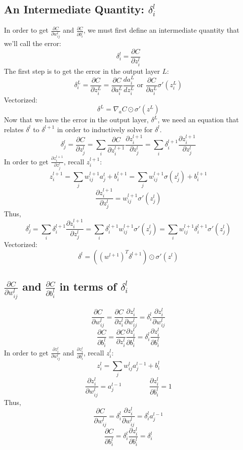\documentclass[11pt]{article}
\begin{document}
\subsection{An Intermediate Quantity: $\delta_i^l$}
In order to get $\frac{\partial C}{\partial w_{ij}^l}$ and $\frac{\partial C}{\partial b_i^l}$, we must first define an intermediate quantity that we'll call the error:
\[\delta_i^l = \frac{\partial C}{\partial z_i^l}\]
The first step is to get the error in the output layer $L$:
\[\delta_i^L = \frac{\partial C}{\partial z_i^L} = \frac{\partial C}{\partial a_i^L} \frac{d a_i^L}{d z_i^L} \text{ or } \frac{\partial C}{\partial a_i^L} \sigma'(z_i^L)\]
Vectorized:
\[\delta^L = \nabla_a C \odot \sigma'(z^L)\]
Now that we have the error in the output layer, $\delta^L$, we need an equation that relates $\delta^l$ to $\delta^{l + 1}$ in order to inductively solve for $\delta^l$.
\[\delta_j^l = \frac{\partial C}{\partial z_j^l} = \sum_i \frac{\partial C}{\partial z_i^{l + 1}} \frac{\partial z_i^{l + 1}}{\partial z_j^l} = \sum_i \delta_i^{l + 1} \frac{\partial z_i^{l + 1}}{\partial z_j^l}\]
In order to get $\frac{\partial z_i^{l + 1}}{\partial z_j^l}$, recall $z_i^{l + 1}$:
\[z_i^{l + 1} = \sum_j w_{ij}^{l + 1} a_j^l + b_i^{l + 1} = \sum_j w_{ij}^{l + 1} \sigma(z_j^l) + b_i^{l + 1}\]
\[\frac{\partial z_i^{l + 1}}{\partial z_j^l} = w_{ij}^{l + 1} \sigma'(z_j^l)\]
Thus,
\[\delta_j^l = \sum_i \delta_i^{l + 1} \frac{\partial z_i^{l + 1}}{\partial z_j^l} = \sum_i \delta_i^{l + 1} w_{ij}^{l + 1} \sigma'(z_j^l) = \sum_i w_{ij}^{l + 1} \delta_i^{l + 1} \sigma'(z_j^l)\]
Vectorized:
\[\delta^l = \left(\left(w^{l + 1}\right)^T \delta^{l + 1}\right) \odot \sigma'(z^l)\]

\subsection{$\frac{\partial C}{\partial w_{ij}^l}$ and $\frac{\partial C}{\partial b_i^l}$ in terms of $\delta_i^l$}

\[\frac{\partial C}{\partial w_{ij}^l} = \frac{\partial C}{\partial z_i^l} \frac{\partial z_i^l}{\partial w_{ij}^l} = \delta_i^l \frac{\partial z_i^l}{\partial w_{ij}^l}\]
\[\frac{\partial C}{\partial b_i^l} = \frac{\partial C}{\partial z_i^l} \frac{\partial z_i^l}{\partial b_i^l} = \delta_i^l \frac{\partial z_i^l}{\partial b_i^l}\]
In order to get $\frac{\partial z_i^l}{\partial w_{ij}^l}$ and $\frac{\partial z_i^l}{\partial b_i^l}$, recall $z_i^l$:
\[z_i^l = \sum_j w_{ij}^l a_j^{l - 1} + b_i^l\]
\[\frac{\partial z_i^l}{\partial w_{ij}^l} = a_j^{l - 1}
\qquad \qquad 
\frac{\partial z_i^l}{\partial b_i^l} = 1\]
Thus,
\[\frac{\partial C}{\partial w_{ij}^l} = \delta_i^l \frac{\partial z_i^l}{\partial w_{ij}^l} = \delta_i^l a_j^{l - 1}\]
\[\frac{\partial C}{\partial b_i^l} = \delta_i^l \frac{\partial z_i^l}{\partial b_i^l} = \delta_i^l\]
\end{document}
